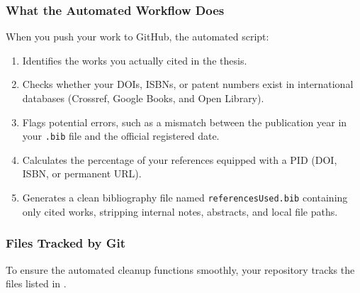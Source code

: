 \documentclass[12pt, twoside]{article}
\newcommand{\fname}[1]{\texttt{#1}}
\begin{document}
\subsubsection{What the Automated Workflow Does}
When you push your work to GitHub, the automated script:
\begin{enumerate}
    \item Identifies the works you actually cited in the thesis.
    
    \item Checks whether your \glspl{DOI}, \glspl{ISBN}, or patent numbers exist in international databases (Crossref, Google Books, and Open Library).
    
    \item Flags potential errors, such as a mismatch between the publication year in your \fname{.bib} file and the official registered date.
    
    \item Calculates the percentage of your references equipped with a \gls{PID} (\gls{DOI}, \gls{ISBN}, or permanent \gls{URL}).
    
    \item Generates a clean bibliography file named \fname{referencesUsed.bib} containing only cited works, stripping internal notes, abstracts, and local file paths.
\end{enumerate}


\subsubsection{Files Tracked by Git}
To ensure the automated cleanup functions smoothly, your repository tracks the files listed in .
\end{document}
